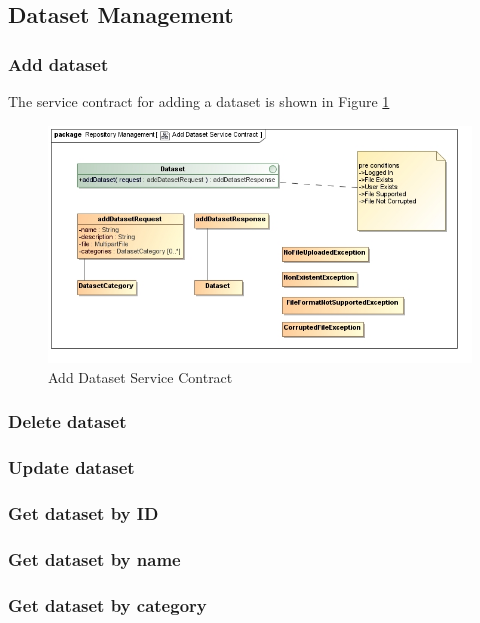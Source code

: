 \subsection{Dataset Management}

\subsubsection {Add dataset}
The service contract for adding a dataset is shown in Figure \ref{fig:addDatasetService}
\begin{figure}[H]
  \begin{center}
  \includegraphics[scale=0.6]{../Diagrams and Charts/Test Data/Add Dataset Service Contract.jpg}
  \caption{Add Dataset Service Contract}
  \label{fig:addDatasetService}
  \end{center}  
\end{figure}

\subsubsection {Delete dataset}
\subsubsection {Update dataset}
\subsubsection {Get dataset by ID}
\subsubsection {Get dataset by name}
\subsubsection {Get dataset by category}
